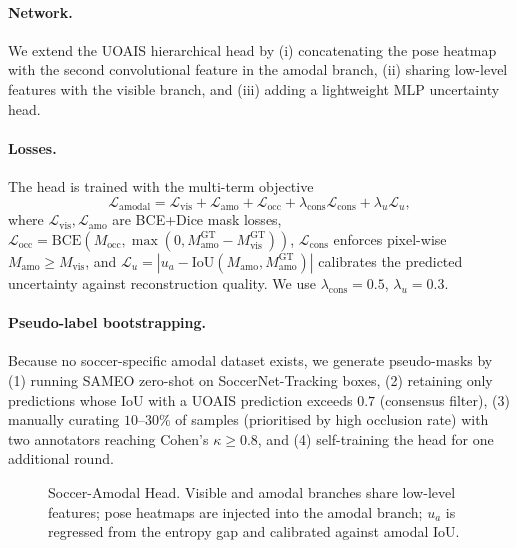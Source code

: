 \documentclass[conference]{IEEEtran}
\begin{document}
\paragraph*{Network.}
We extend the UOAIS hierarchical head \cite{uoais} by (i) concatenating the pose heatmap with the second convolutional feature in the amodal branch, (ii) sharing low-level features with the visible branch, and (iii) adding a lightweight MLP uncertainty head.

\paragraph*{Losses.}
The head is trained with the multi-term objective
\begin{equation}
\mathcal{L}_{\text{amodal}} = \mathcal{L}_{\text{vis}} + \mathcal{L}_{\text{amo}} + \mathcal{L}_{\text{occ}} + \lambda_{\text{cons}}\mathcal{L}_{\text{cons}} + \lambda_u \mathcal{L}_u,
\label{eq:amodal}
\end{equation}
where $\mathcal{L}_{\text{vis}},\mathcal{L}_{\text{amo}}$ are BCE+Dice mask losses, $\mathcal{L}_{\text{occ}}=\text{BCE}(M_{\text{occ}},\max(0,M_{\text{amo}}^{\text{GT}}-M_{\text{vis}}^{\text{GT}}))$, $\mathcal{L}_{\text{cons}}$ enforces pixel-wise $M_{\text{amo}}\geq M_{\text{vis}}$, and $\mathcal{L}_u = |u_a - \text{IoU}(M_{\text{amo}},M_{\text{amo}}^{\text{GT}})|$ calibrates the predicted uncertainty against reconstruction quality. We use $\lambda_{\text{cons}}=0.5$, $\lambda_u=0.3$.

\paragraph*{Pseudo-label bootstrapping.}
Because no soccer-specific amodal dataset exists, we generate pseudo-masks by (1) running SAMEO \cite{sameo} zero-shot on SoccerNet-Tracking boxes, (2) retaining only predictions whose IoU with a UOAIS \cite{uoais} prediction exceeds $0.7$ (consensus filter), (3) manually curating $10$--$30\%$ of samples (prioritised by high occlusion rate) with two annotators reaching Cohen's $\kappa\geq 0.8$, and (4) self-training the head for one additional round.

\begin{figure}[t]
  \centering
  \caption{Soccer-Amodal Head. Visible and amodal branches share low-level features; pose heatmaps are injected into the amodal branch; $u_a$ is regressed from the entropy gap and calibrated against amodal IoU.}
  \label{fig:amodal}
\end{figure}
\end{document}
